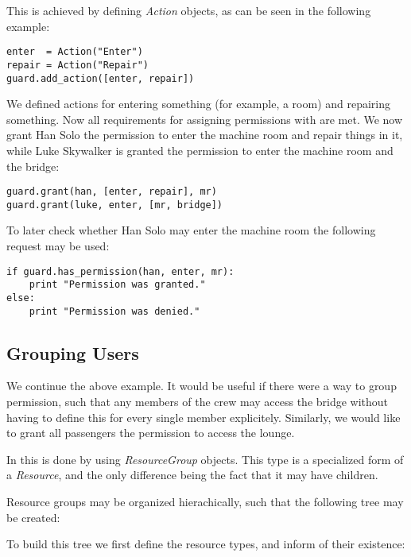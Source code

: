 This is achieved by defining {\it Action} objects, as can be seen in the 
following example:

\begin{lstlisting}
enter  = Action("Enter")
repair = Action("Repair")
guard.add_action([enter, repair])
\end{lstlisting}

We defined actions for entering something (for example, a room) and 
repairing something.
Now all requirements for assigning permissions with \product are met. We 
now grant Han Solo the permission to enter the machine room and repair 
things in it, while Luke Skywalker is granted the permission to enter
the machine room and the bridge:

\begin{lstlisting}
guard.grant(han, [enter, repair], mr)
guard.grant(luke, enter, [mr, bridge])
\end{lstlisting}

To later check whether Han Solo may enter the machine room the following 
request may be used:

\begin{lstlisting}
if guard.has_permission(han, enter, mr):
    print "Permission was granted."
else:
    print "Permission was denied."
\end{lstlisting}


\subsection{\label{intro:groups}Grouping Users}

We continue the above example. It would be useful if there were a way to 
group permission, such that any members of the crew may access the bridge 
without having to define this for every single member explicitely.
Similarly, we would like to grant all passengers the permission to access 
the lounge.

In \product this is done by using {\it ResourceGroup} objects. This type 
is a specialized form of a {\it Resource}, and the only difference being 
the fact that it may have children.

Resource groups may be organized hierachically, such that the following 
tree may be created:


To build this tree we first define the resource types, and inform 
\product of their existence:

